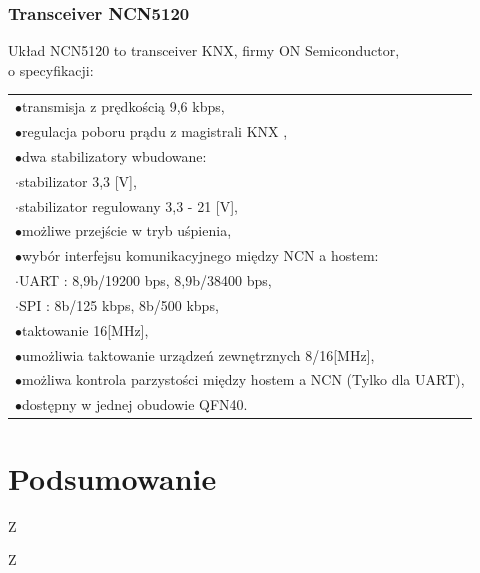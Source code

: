 \documentclass[a4paper, 11pt]{report}
\newcommand{\ods}{\hspace*{1em}}
\begin{document}
\newpage
\subsection{Transceiver NCN5120}
Układ NCN5120 to transceiver KNX, firmy ON Semiconductor,\\ o specyfikacji:

\begin{table}[h]
	\centering
	\begin{tabular}{l}
		$\bullet$transmisja z prędkością 9,6 kbps,\\
		$\bullet$regulacja poboru prądu z magistrali KNX ,\\
		$\bullet$dwa stabilizatory wbudowane:\\
		\ods $\cdot$stabilizator 3,3 [V],\\
		\ods $\cdot$stabilizator regulowany 3,3 - 21 [V],\\
		$\bullet$możliwe przejście w tryb uśpienia,\\
		$\bullet$wybór interfejsu komunikacyjnego między NCN a hostem:\\
		\ods $\cdot$UART : 8,9b/19200 bps, 8,9b/38400 bps,\\
		\ods $\cdot$SPI :  8b/125 kbps, 8b/500 kbps,\\
		$\bullet$taktowanie 16[MHz],\\
		$\bullet$umożliwia taktowanie urządzeń zewnętrznych 8/16[MHz],\\
		$\bullet$możliwa kontrola parzystości między hostem a NCN (Tylko dla UART),\\
		$\bullet$dostępny w jednej obudowie QFN40.\\
	\end{tabular}
\end{table}


\chapter{Podsumowanie}
\ods Z

\newpage
\ods Z

\newpage
\listoffigures

\newpage
\listoftables
\end{document}
